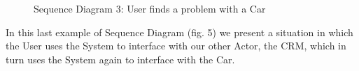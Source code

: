 \documentclass[a4paper]{article}
\begin{document}
\begin{figure}[h]
\centering
\vspace*{\fill}
\noindent{}%
\caption {Sequence Diagram 3: User finds a problem with a Car}
\vspace*{0.5cm}
\end{figure}
In this last example of Sequence Diagram (fig. 5) we present a situation in which the User uses the System to interface with our other Actor, the CRM, which in turn uses the System again to interface with the Car.
\newpage
\end{document}
